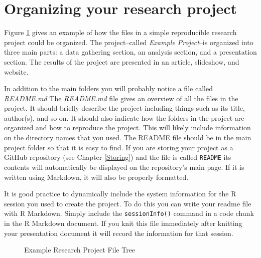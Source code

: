 \section{Organizing your research project}

Figure \ref{ExampleTree} gives an example of how the files in a simple reproducible research project could be organized. The project--called {\emph{Example Project}}--is organized into three main parts: a data gathering section, an analysis section, and a presentation section. The results of the project are presented in an article, slideshow, and website.

In addition to the main folders you will probably notice a file called {\emph{README.md}} The {\emph{README.md}} file gives an overview of all the files in the project. It should briefly describe the project including things such as its title, author(s), and so on. It should also indicate how the folders in the project are organized and how to reproduce the project. This will likely include information on the directory names that you used. The README file should be in the main project folder so that it is easy to find. If you are storing your project as a GitHub repository (see Chapter \ref{Storing}) and the file is called \texttt{README} its contents will automatically be displayed on the repository's main page. If it is written using Markdown, it will also be properly formatted.

It is good practice to dynamically include the system information for the R session you used to create the project. To do this you can write your readme file with R Markdown. Simply include the \texttt{sessionInfo()} command in a code chunk in the R Markdown document. If you knit this file immediately after knitting your presentation document it will record the information for that session.


\clearpage
\thispagestyle{plain}
\begin{landscape}
\begin{figure}[th!]
    \caption{Example Research Project File Tree}
    \label{ExampleTree}
    \begin{center}
    
    
    \end{center}
\end{figure}
\end{landscape}

